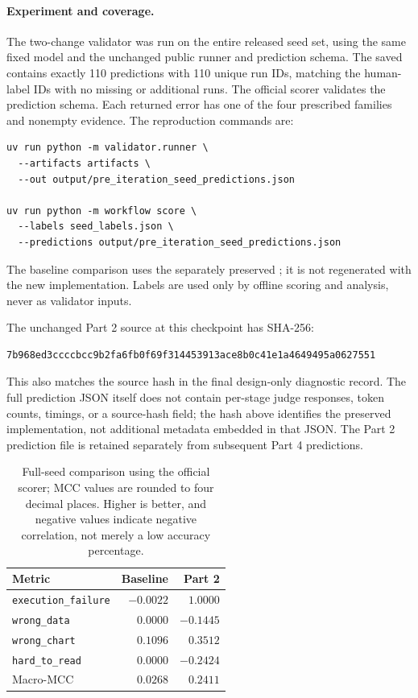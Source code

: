 \documentclass[11pt]{article}
\begin{document}
\paragraph{Experiment and coverage.}
The two-change validator was run on the entire released seed set, using the
same fixed model and the unchanged public runner and prediction schema.
The saved  contains exactly
110 predictions with 110 unique run IDs, matching the human-label IDs with no
missing or additional runs. The official scorer validates the prediction
schema. Each returned error has one of the four prescribed families and
nonempty evidence. The reproduction commands are:
\begin{verbatim}
uv run python -m validator.runner \
  --artifacts artifacts \
  --out output/pre_iteration_seed_predictions.json

uv run python -m workflow score \
  --labels seed_labels.json \
  --predictions output/pre_iteration_seed_predictions.json
\end{verbatim}
The baseline comparison uses the separately preserved
; it is not regenerated with the new
implementation. Labels are used only by offline scoring and analysis, never
as validator inputs.

The unchanged Part 2 source at this checkpoint has SHA-256:
\begin{verbatim}
7b968ed3ccccbcc9b2fa6fb0f69f314453913ace8b0c41e1a4649495a0627551
\end{verbatim}
This also matches the source hash in the final design-only diagnostic record.
The full prediction JSON itself does not contain per-stage judge responses,
token counts, timings, or a source-hash field; the hash above identifies the
preserved implementation, not additional metadata embedded in that JSON.
The Part 2 prediction file is retained separately from subsequent Part 4
predictions.

\begin{table}[htbp]
\centering
\small
\begin{tabular}{lrr}
\toprule
Metric & Baseline & Part 2 \\
\midrule
\texttt{execution\_failure} & $-0.0022$ & $1.0000$ \\
\texttt{wrong\_data}        & $0.0000$  & $-0.1445$ \\
\texttt{wrong\_chart}       & $0.1096$  & $0.3512$ \\
\texttt{hard\_to\_read}     & $0.0000$  & $-0.2424$ \\
\midrule
Macro-MCC                  & $0.0268$  & $0.2411$ \\
\bottomrule
\end{tabular}
\caption{Full-seed comparison using the official scorer; MCC values are
rounded to four decimal places. Higher is better, and negative values indicate
negative correlation, not merely a low accuracy percentage.}
\label{tab:part2-mcc}
\end{table}
\end{document}
